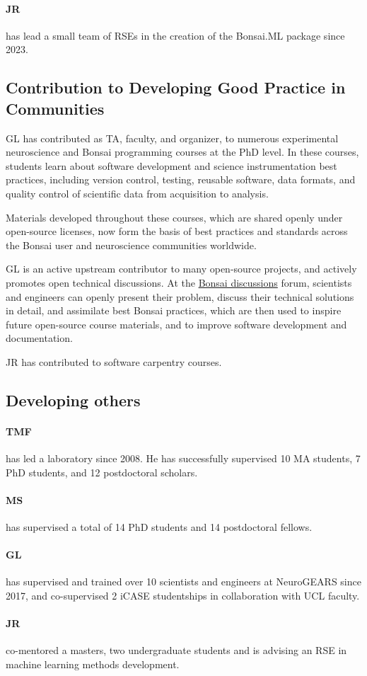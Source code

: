 \paragraph{JR} has lead a small team of RSEs in the
creation of the Bonsai.ML package since 2023.

\subsection{Contribution to Developing Good Practice in Communities}

GL has contributed as TA, faculty, and organizer, to numerous experimental neuroscience and Bonsai programming courses at the PhD level. In these courses, students learn about software development and science instrumentation best practices, including version control, testing, reusable software, data formats, and quality control of scientific data from acquisition to analysis.

Materials developed throughout these courses, which are shared openly under open-source licenses, now form the basis of best practices and standards across the Bonsai user and neuroscience communities worldwide.

GL is an active upstream contributor to many open-source projects, and actively promotes open technical discussions. At the \href{https://github.com/orgs/bonsai-rx/discussions}{Bonsai discussions} forum, scientists and engineers can openly present their problem, discuss their technical solutions in detail, and assimilate best
Bonsai practices, which are then used to inspire future open-source course materials, and to improve software development and documentation.

JR has contributed to software carpentry courses.


\subsection{Developing others}

\paragraph{TMF} has led a laboratory since 2008. He has
successfully supervised 10 MA students, 7 PhD students, and 12 postdoctoral
scholars.

\paragraph{MS} has supervised a total of 14 PhD students and
14 postdoctoral fellows.

\paragraph{GL} has supervised and trained over 10 scientists and engineers at NeuroGEARS since 2017, and co-supervised 2 iCASE studentships in collaboration with UCL faculty.

\paragraph{JR} co-mentored a masters, two undergraduate
students and is advising an RSE in machine learning methods development.
